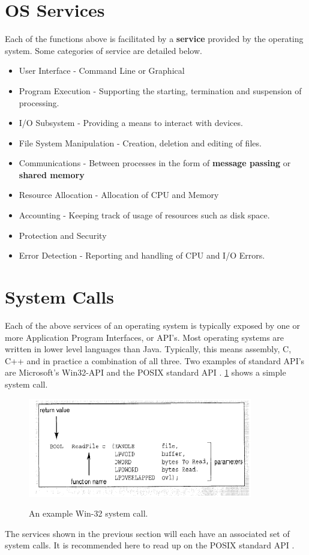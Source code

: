 \documentclass[10pt,a4paper]{article}
\begin{document}
\section{OS Services}
Each of the functions above is facilitated by a {\bf service} provided by the operating system. Some categories of service are detailed below. 
\begin{itemize}
\item User Interface - Command Line or Graphical
\item Program Execution - Supporting the starting, termination and suspension of processing. 
\item I/O Subsystem - Providing a means to interact with devices.  
\item File System Manipulation - Creation, deletion and editing of files.
\item Communications - Between processes in the form of {\bf message passing} or {\bf shared memory}
\item Resource Allocation - Allocation of CPU and Memory
\item Accounting - Keeping track of usage of resources such as disk space. 
\item Protection and Security
\item Error Detection - Reporting and handling of CPU and I/O Errors. 
\end{itemize}
\section{System Calls}
Each of the above services of an operating system is typically exposed by one or more Application Program Interfaces, or API's. Most operating systems are written in lower level languages than Java. Typically, this means assembly, C, C++ and in practice a combination of all three. Two examples of standard API's are Microsoft's Win32-API \cite{WIN32API} and the POSIX standard API \cite{POSIXAPI}. \ref{systemcall} shows a simple system call. 
\begin{figure}
\caption{An example Win-32 system call. \cite{OSCONCEPTS}}
\begin{center}
\includegraphics[scale=0.45]{../images/system-call.png}
\label{systemcall}
\end{center}
\end{figure}
The services shown in the previous section will each have an associated set of system calls. It is recommended here to read up on the POSIX standard API \cite{POSIXAPI}.
\end{document}
